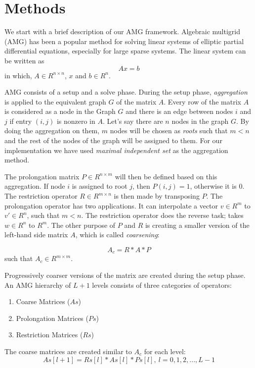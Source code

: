 \section{Methods}\label{sec:method} %

We start with a brief description of our AMG framework. 
Algebraic multigrid (AMG) has been a popular method for solving linear systems
of elliptic partial differential equations, especially for large sparse systems.
The linear system can be written as
\begin{equation}
 Ax = b
\end{equation}
in which, $A \in R^{n \times n}$, $x$ and $b \in R^{n}$.

AMG consists of a setup and a solve phase. During the setup phase, \textit{aggregation} is applied to the equivalent 
graph $G$ of the matrix $A$. Every row of the matrix $A$ is considered as a node in the Graph $G$ and there is an edge between 
nodes $i$ and $j$ if entry $(i,j)$ is nonzero in $A$. Let's say there are $n$ nodes in the graph $G$.
By doing the aggregation on them, $m$ nodes will be chosen as \textit{roots} such that $m < n$ and the rest of the nodes of 
the graph will be assigned to them.
For our implementation we have used \textit{maximal independent set} as the aggregation method.

The prolongation matrix $P \in R^{n \times m}$ will then be defined based on this aggregation. If node $i$ is assigned to root 
$j$, then $P(i,j) = 1$, otherwise it is $0$. The restriction operator $R \in R^{m \times n}$ is then made by transposing $P$.
The prolongation operator has two applications. It can interpolate a vector $v \in R^m$ to $v' \in R^n$, such that $m < n$.
The restriction operator does the reverse task; takes $w \in R^n$ to $R^m$.
The other purpose of $P$ and $R$ is creating a smaller version of the left-hand side matrix $A$, which is called \textit{coarsening}:

\begin{equation}
 A_c = R * A * P
\end{equation}
such that $A_c \in R^{m \times m}$.

Progressively coarser versions of the matrix are created during the setup phase.
An AMG hierarchy of $L+1$ levels consists of three categories of operators:
\begin{enumerate}
 \item Coarse Matrices ($As$)
 \item Prolongation Matrices ($Ps$)
 \item Restriction Matrices ($Rs$)
\end{enumerate}
The coarse matrices are created similar to $A_c$ for each level:
\begin{equation}
 As[l+1] = Rs[l] * As[l] * Ps[l],\ l = 0, 1, 2, ..., L-1
\end{equation}

